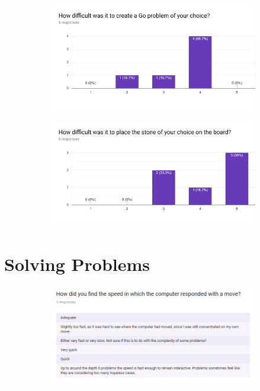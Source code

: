 \documentclass{l4proj}
\begin{document}
\begin{appendices}
\begin{figure}[H]
\centering
\begin{subfigure}[b]{\textwidth}
\centering
\includegraphics[width=\textwidth]{A1/14.png}
\end{subfigure}
\end{figure}



\begin{figure}[H]
\centering
\begin{subfigure}[b]{\textwidth}
\centering
\includegraphics[width=\textwidth]{A1/15.png}
\end{subfigure}
\end{figure}


\section{Solving Problems}

\begin{figure}[H]
\centering
\begin{subfigure}[b]{\textwidth}
\centering
\includegraphics[width=\textwidth]{A1-2/1.png}
\end{subfigure}
\end{figure}


\end{appendices}
\end{document}
